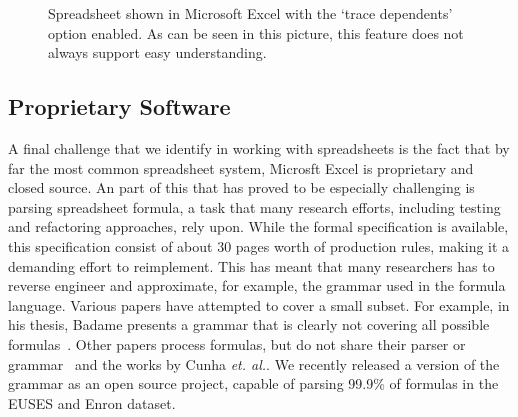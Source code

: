 \documentclass[conference]{IEEEtran}
\begin{document}
\begin{figure}
	\centering
	\setlength{\fboxsep}{0pt}
	\setlength{\fboxrule}{1pt}
	\caption{Spreadsheet shown in Microsoft Excel with the `trace dependents' option enabled. As can be seen in this picture, this feature does not always support easy understanding.}
	\label{fig:ComplexDependence}
\end{figure}


\subsection{Proprietary Software} 
A final challenge that we identify in working with spreadsheets is the fact that by far the most common spreadsheet system, Microsft Excel is proprietary and closed source. An part of this that has proved to be especially challenging is parsing spreadsheet formula, a task that many research efforts, including testing and refactoring approaches, rely upon. While the formal specification is available, this specification consist of about 30 pages worth of production rules, making it a demanding effort to reimplement. This has meant that many researchers has to reverse engineer and approximate, for example, the grammar used in the formula language.  Various papers have attempted to cover a small subset. For example, in his thesis, Badame presents a grammar that is clearly not covering all possible formulas~\cite{badame_thesis_2012}. Other papers process formulas, but do not share their parser or grammar~\cite{barowy_checkcell:_2014} and the works by Cunha \emph{et. al.}\cite{cunha_automatically_2010, cunha_towards_2012}. We recently released a version of the grammar as an open source project, capable of parsing 99.9\% of formulas in the EUSES and Enron dataset.
\end{document}

